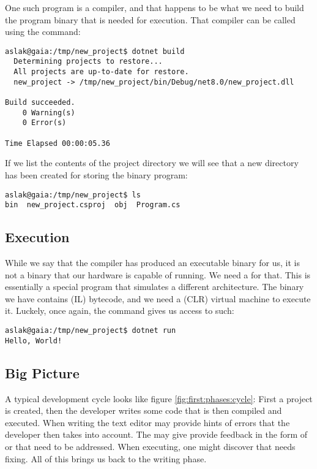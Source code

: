 One such program is a compiler, and that happens to be what we need to build the program binary that is needed for execution. That compiler can be called using the  command:

\begin{verbatim}
aslak@gaia:/tmp/new_project$ dotnet build
  Determining projects to restore...
  All projects are up-to-date for restore.
  new_project -> /tmp/new_project/bin/Debug/net8.0/new_project.dll

Build succeeded.
    0 Warning(s)
    0 Error(s)

Time Elapsed 00:00:05.36
\end{verbatim}

If we list the contents of the project directory we will see that a new  directory has been created for storing the binary program:

\begin{verbatim}
aslak@gaia:/tmp/new_project$ ls
bin  new_project.csproj  obj  Program.cs
\end{verbatim}

\subsection{Execution}

While we say that the compiler has produced an executable binary for us, it is not a binary that our hardware is capable of running. We need a  for that. This is essentially a special program that simulates a different architecture. The binary we have contains  (IL) bytecode, and we need a  (CLR) virtual machine to execute it. Luckely, once again, the  command gives us access to such:

\begin{verbatim}
aslak@gaia:/tmp/new_project$ dotnet run
Hello, World!
\end{verbatim}

\subsection{Big Picture}

A typical development cycle looks like figure \ref{fig:first:phases:cycle}: First a project is created, then the developer writes some code that is then compiled and executed. When writing the text editor may provide hints of errors that the developer then takes into account. The  may give provide feedback in the form of  or  that need to be addressed. When executing, one might discover  that needs fixing. All of this brings us back to the writing phase.

